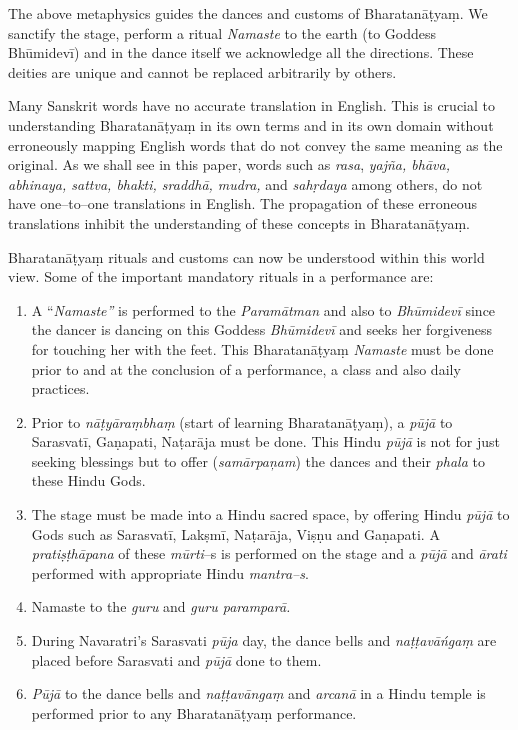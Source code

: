 The above metaphysics guides the dances and customs of Bharata\-nāṭyaṃ. We sanctify the stage, perform a ritual \textit{Namaste} to the earth (to Goddess Bhūmidevī) and in the dance itself we acknowledge all the directions. These deities are unique and cannot be replaced arbitrarily by others.

Many Sanskrit words have no accurate translation in English. This is crucial to understanding Bharatanāṭyaṃ in its own terms and in its own domain without erroneously mapping English words that do not convey the same meaning as the original. As we shall see in this paper, words such as \textit{rasa}, \textit{yajña, bhāva, abhinaya, sattva, bhakti, sraddhā, mudra,} and \textit{sahṛdaya} among others, do not have one–to–one translations in English. The propagation of these erroneous translations inhibit the understanding of these concepts in Bharatanāṭyaṃ.

Bharatanāṭyaṃ rituals and customs can now be understood within this world view. Some of the important mandatory rituals in a performance are:

\begin{enumerate}[{\rm 1)}]
\itemsep=0pt
\item A “\textit{Namaste”} is performed to the \textit{Paramātman }and also to \textit{Bhūmidevī} since the dancer is dancing on this Goddess \textit{Bhūmidevī} and seeks her forgiveness for touching her with the feet. This Bharatanāṭyaṃ \textit{Namaste }must be done prior to and at the conclusion of a performance, a class and also daily practices.

 \item Prior to \textit{nāṭyāraṃbhaṃ }(start of learning Bharatanāṭyaṃ), a \textit{pūjā }to Sarasvatī, Gaṇapati, Naṭarāja must be done. This Hindu \textit{pūjā }is not for just seeking blessings but to offer (\textit{samārpaņam}) the dances and their \textit{phala }to these Hindu Gods.

 \item The stage must be made into a Hindu sacred space, by offering Hindu \textit{pūjā }to Gods such as Sarasvatī, Lakṣmī, Naṭarāja, Viṣṇu and Gaṇapati. A \textit{pratiṣṭhāpana }of these \textit{mūrti}–s is performed on the stage and a \textit{pūjā }and \textit{ārati} performed with appropriate Hindu \textit{mantra–s}.

 \item Namaste to the \textit{guru} and \textit{guru paramparā.}

 \item During Navaratri’s Sarasvati \textit{pūja} day, the dance bells and \textit{naṭṭavāńgaṃ} are placed before Sarasvati and \textit{pūjā }done to them.

 \item \textit{Pūjā} to the dance bells and \textit{naṭṭavāngaṃ} and \textit{arcanā} in a Hindu temple is performed prior to any Bharatanāṭyaṃ performance.

\end{enumerate}

